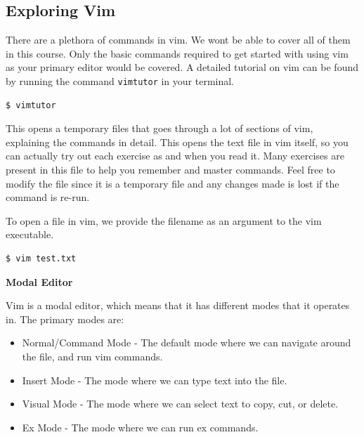 \subsection{Exploring Vim}

There are a plethora of commands in vim.
We wont be able to cover all of them in this course.
Only the basic commands required to get started
with using vim as your primary editor would be
covered. A detailed tutorial on vim can be found
by running the command \lstinline|vimtutor| in your terminal.

\begin{lstlisting}
$ vimtutor
\end{lstlisting}

This opens a temporary files that goes through a lot of
sections of vim, explaining the commands in detail.
This opens the text file in vim itself, so you can
actually try out each exercise as and when you read it.
Many exercises are present in this file to help you
remember and master commands. Feel free to modify the
file since it is a temporary file and any changes made
is lost if the command is re-run.

To open a file in vim, we provide the filename as an argument
to the vim executable.

\begin{lstlisting}[language=bash]
$ vim test.txt
\end{lstlisting}


\textbf{Modal Editor}


Vim is a modal editor, which means that it has different modes
that it operates in. The primary modes are:

\begin{itemize}
  \item Normal/Command Mode - The default mode where we can navigate
    around the file, and run vim commands.
  \item Insert Mode - The mode where we can type text into the file.
  \item Visual Mode - The mode where we can select text to copy, cut, or delete.
  \item Ex Mode - The mode where we can run ex commands.
\end{itemize}

